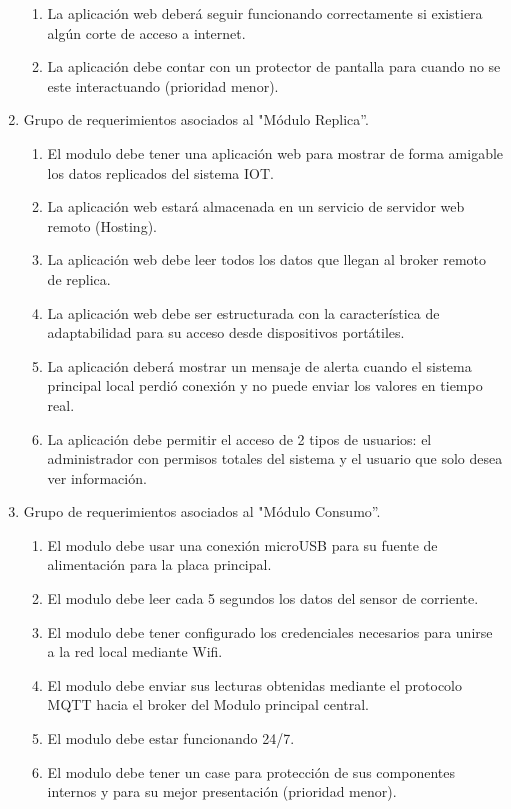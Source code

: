 \documentclass[11pt]{charter}
\begin{document}
\begin{enumerate}
\begin{enumerate}
	\item La aplicación web deberá seguir funcionando correctamente si existiera algún corte de acceso a internet.
	\item La aplicación debe contar con un protector de pantalla para cuando no se este interactuando (prioridad menor).
	\end{enumerate}
\item Grupo de requerimientos asociados al "Módulo Replica''.
	\begin{enumerate}
	\item El modulo debe tener una aplicación web para mostrar de forma amigable los datos replicados del sistema IOT.
	\item La aplicación web estará almacenada en un servicio de servidor web remoto (Hosting).
	\item La aplicación web debe leer todos los datos que llegan al broker remoto de replica.
	\item La aplicación web debe ser estructurada con la característica de adaptabilidad para su acceso desde dispositivos portátiles.
	\item La aplicación deberá mostrar un mensaje de alerta cuando el sistema principal local perdió conexión y no puede enviar los valores en tiempo real.
	\item La aplicación debe permitir el acceso de 2 tipos de usuarios: el administrador con permisos totales del sistema y el usuario que solo desea ver información.
	\end{enumerate}
\item Grupo de requerimientos asociados al "Módulo Consumo''.
	\begin{enumerate}
	\item El modulo debe usar una conexión microUSB para su fuente de alimentación para la placa principal.
	\item El modulo debe leer cada 5 segundos los datos del sensor de corriente.
	\item El modulo debe tener configurado los credenciales necesarios para unirse a la red local mediante Wifi.
	\item El modulo debe enviar sus lecturas obtenidas mediante el protocolo MQTT hacia el broker del Modulo principal central.
	\item El modulo debe estar funcionando 24/7.
	\item El modulo debe tener un case para protección de sus componentes internos y para su mejor presentación (prioridad menor).

\end{enumerate}
\end{enumerate}
\end{document}
